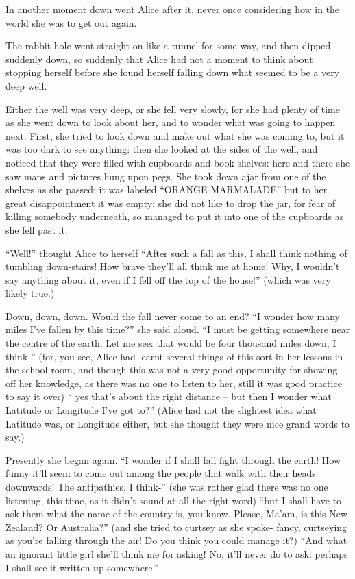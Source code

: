 \documentclass{l3proj}
\begin{document}
In another moment down went Alice after it, never once considering how in
the world she was to get out again.

The rabbit-hole went straight on like a tunnel for some way, and then
dipped suddenly down, so suddenly that Alice had not a moment to think
about stopping herself before she found herself falling down what seemed to
be a very deep well.

Either the well was very deep, or she fell very slowly, for she had plenty
of time as she went down to look about her, and to wonder what was going to
happen next. First, she tried to look down and make out what she was coming
to, but it was too dark to see anything: then she looked at the sides of
the well, and noticed that they were filled with cupboards and
book-shelves: here and there she saw maps and pictures hung upon pegs. She
took down ajar from one of the shelves as she passed: it was labeled
``ORANGE MARMALADE'' but to her great disappointment it was empty: she did
not like to drop the jar, for fear of killing somebody underneath, so
managed to put it into one of the cupboards as she fell past it.

``Well!'' thought Alice to herself ``After such a fall as this, I shall think
nothing of tumbling down-stairs! How brave they'll all think me at home!
Why, I wouldn't say anything about it, even if I fell off the top of the
house!'' (which was very likely true.)

Down, down, down. Would the fall never come to an end? ``I wonder how many
miles I've fallen by this time?'' she said aloud. ``I must be getting
somewhere near the centre of the earth. Let me see: that would be four
thousand miles down, I think-'' (for, you see, Alice had learnt several
things of this sort in her lessons in the school-room, and though this was
not a very good opportunity for showing off her knowledge, as there was no
one to listen to her, still it was good practice to say it over) `` yes
that's about the right distance -- but then I wonder what Latitude or
Longitude I've got to?'' (Alice had not the slightest idea what Latitude
was, or Longitude either, but she thought they were nice grand words to
say.)

Presently she began again. ``I wonder if I shall fall fight through the
earth! How funny it'll seem to come out among the people that walk with
their heads downwards! The antipathies, I think-'' (she was rather glad
there was no one listening, this time, as it didn't sound at all the right
word) ``but I shall have to ask them what the name of the country is, you
know. Please, Ma'am, is this New Zealand? Or Australia?'' (and she tried to
curtsey as she spoke- fancy, curtseying as you're falling through the air!
Do you think you could manage it?) ``And what an ignorant little girl she'll
think me for asking! No, it'll never do to ask: perhaps I shall see it
written up somewhere.''
\end{document}
